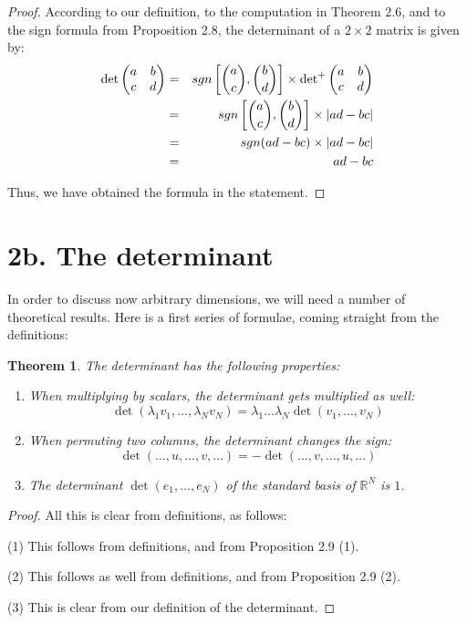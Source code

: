 \documentclass[12pt]{amsbook}
\newtheorem{theorem}{Theorem}[chapter]
\begin{document}
\begin{proof}
According to our definition, to the computation in Theorem 2.6, and to the sign formula from Proposition 2.8, the determinant of a $2\times2$ matrix is given by:
\begin{eqnarray*}
\det\begin{pmatrix}a&b\\ c&d\end{pmatrix}
&=&sgn\left[\binom{a}{c},\binom{b}{d}\right]\times {\rm det}^+\begin{pmatrix}a&b\\ c&d\end{pmatrix}\\
&=&sgn\left[\binom{a}{c},\binom{b}{d}\right]\times|ad-bc|\\
&=&sgn(ad-bc)\times|ad-bc|\\
&=&ad-bc
\end{eqnarray*}

Thus, we have obtained the formula in the statement.
\end{proof}

\section*{2b. The determinant}

In order to discuss now arbitrary dimensions, we will need a number of theoretical results. Here is a first series of formulae, coming straight from the definitions:


\begin{theorem}
The determinant has the following properties:
\begin{enumerate}
\item When multiplying by scalars, the determinant gets multiplied as well:
$$\det(\lambda_1v_1,\ldots,\lambda_Nv_N)=\lambda_1\ldots\lambda_N\det(v_1,\ldots,v_N)$$

\item When permuting two columns, the determinant changes the sign:
$$\det(\ldots,u,\ldots,v,\ldots)=-\det(\ldots,v,\ldots,u,\ldots)$$

\item The determinant $\det(e_1,\ldots,e_N)$ of the standard basis of $\mathbb R^N$ is $1$.
\end{enumerate}
\end{theorem}

\begin{proof}
All this is clear from definitions, as follows:

\medskip

(1) This follows from definitions, and from Proposition 2.9 (1).

\medskip

(2) This follows as well from definitions, and from Proposition 2.9 (2).

\medskip

(3) This is clear from our definition of the determinant.
\end{proof}
\end{document}
